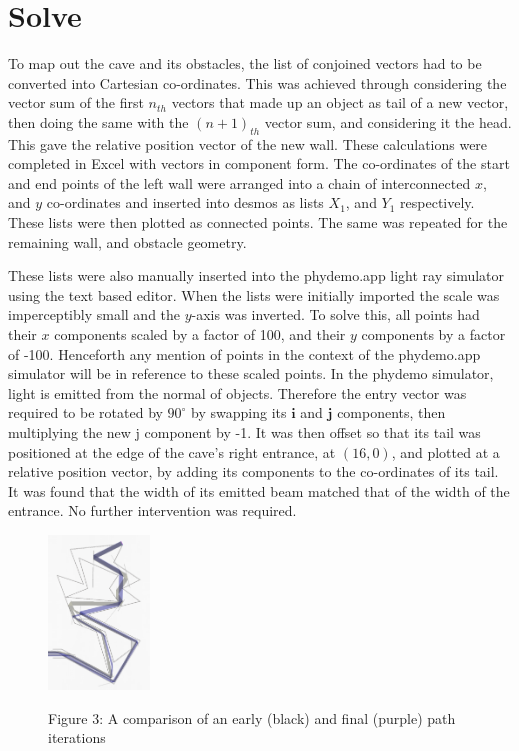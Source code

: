\documentclass[11pt, letterpaper]{article}
\begin{document}
\par 


\section{Solve}

\par 


To map out the cave and its obstacles, the list of conjoined vectors had to be converted into Cartesian co-ordinates. This was achieved through considering the vector sum of the first $n_{th}$ vectors that made up an object as tail of a new vector, then doing the same with the  $(n+1)_{th}$ vector sum, and considering it the head. This gave the relative position vector of the new wall. These calculations were completed in Excel with vectors in component form. \newline
The co-ordinates of the start and end points of the left wall were arranged into a chain of interconnected $x$, and $y$ co-ordinates and inserted into desmos as lists $X_1$, and $Y_1$ respectively. These lists were then plotted as connected points. The same was repeated for the remaining wall, and obstacle geometry.

These lists were also manually inserted into the phydemo.app light ray simulator using the text based editor. When the lists were initially imported the scale was imperceptibly small and the $y$-axis was inverted. To solve this, all points had their $x$ components scaled by a factor of 100, and their $y$ components by a factor of -100. Henceforth any mention of points in the context of the phydemo.app simulator will be in reference to these scaled points.
\newline
In the phydemo simulator, light is emitted from the normal of objects. Therefore the entry vector was required to be rotated by $90^\circ$ by swapping its $\textbf{i}$ and $\textbf{j}$ components, then multiplying the new j component by -1. It was then offset so that its tail was positioned at the edge of the cave's right entrance, at $(16, 0)$, and plotted at a relative position vector, by adding its components to the co-ordinates of its tail. It was found that the width of its emitted beam matched that of the width of the entrance. No further intervention was required. 
\newline
\begin{figure}
		\includegraphics[width=0.24\textwidth]{Diagram 8.png}
	\begin{center}

{Figure 3: A comparison of an early (black) and final (purple) path iterations}
	\end{center}
\end{figure}
\end{document}
